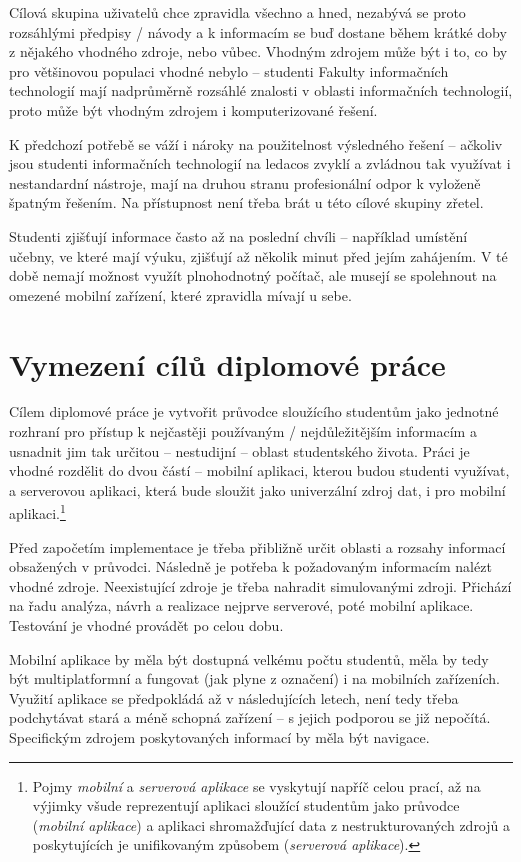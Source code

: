 Cílová skupina uživatelů chce zpravidla všechno a hned, nezabývá se proto rozsáhlými předpisy / návody a k informacím se buď dostane během krátké doby z nějakého vhodného zdroje, nebo vůbec. Vhodným zdrojem může být i to, co by pro většinovou populaci vhodné nebylo -- studenti Fakulty informačních technologií mají nadprůměrně rozsáhlé znalosti v oblasti informačních technologií, proto může být vhodným zdrojem i komputerizované řešení.

K předchozí potřebě se váží i nároky na použitelnost výsledného řešení -- ačkoliv jsou studenti informačních technologií na ledacos zvyklí a zvládnou tak využívat i nestandardní nástroje, mají na druhou stranu profesionální odpor k vyloženě špatným řešením. Na přístupnost není třeba brát u této cílové skupiny zřetel. 

Studenti zjišťují informace často až na poslední chvíli -- například umístění učebny, ve které mají výuku, zjišťují až několik minut před jejím zahájením. V té době nemají možnost využít plnohodnotný počítač, ale musejí se spolehnout na omezené mobilní zařízení, které zpravidla mívají u sebe.

\section{Vymezení cílů diplomové práce}
Cílem diplomové práce je vytvořit průvodce sloužícího studentům jako jednotné rozhraní pro přístup k nejčastěji používaným / nejdůležitějším informacím a usnadnit jim tak určitou -- nestudijní -- oblast studentského života. Práci je vhodné rozdělit do dvou částí -- mobilní aplikaci, kterou budou studenti využívat, a serverovou aplikaci, která bude sloužit jako univerzální zdroj dat, i pro mobilní aplikaci.\footnote{\label{fnt:aplikace} Pojmy \textit{mobilní} a \textit{serverová aplikace} se vyskytují napříč celou prací, až na výjimky všude reprezentují aplikaci sloužící studentům jako průvodce (\textit{mobilní aplikace}) a aplikaci shromažďující data z nestrukturovaných zdrojů a poskytujících je unifikovaným způsobem (\textit{serverová aplikace}).}

Před započetím implementace je třeba přibližně určit oblasti a rozsahy informací obsažených v průvodci. Následně je potřeba k požadovaným informacím nalézt vhodné zdroje. Neexistující zdroje je třeba nahradit simulovanými zdroji. Přichází na řadu analýza, návrh a realizace nejprve serverové, poté mobilní aplikace. Testování je vhodné provádět po celou dobu.

Mobilní aplikace by měla být dostupná velkému počtu studentů, měla by tedy být multiplatformní a fungovat (jak plyne z označení) i na mobilních zařízeních. Využití aplikace se předpokládá až v následujících letech, není tedy třeba podchytávat stará a méně schopná zařízení -- s jejich podporou se již nepočítá. Specifickým zdrojem poskytovaných informací by měla být navigace.

